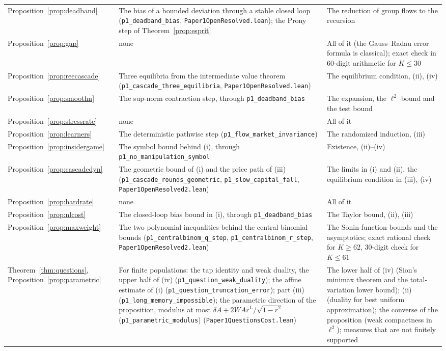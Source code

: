 \documentclass[12pt]{article}
\theoremstyle{definition}
\theoremstyle{remark}
\begin{document}
\begin{longtable}{>{\raggedright\arraybackslash}p{}>{\raggedright\arraybackslash}p{}>{\raggedright\arraybackslash}p{}}
Proposition~\ref{prop:deadband} & The bias of a bounded deviation through a stable closed loop (\texttt{p1\_deadband\_bias}, \nolinkurl{Paper1OpenResolved.lean}); the Prony step of Theorem~\ref{prop:esprit} & The reduction of group flows to the recursion\\
Proposition~\ref{prop:gap} & none & All of it (the Gauss--Radau error formula is classical); exact check in 60-digit arithmetic for $K\le30$\\
Proposition~\ref{prop:reecascade} & Three equilibria from the intermediate value theorem (\texttt{p1\_cascade\_three\_equilibria}, \nolinkurl{Paper1OpenResolved.lean}) & The equilibrium condition, (ii), (iv)\\
Proposition~\ref{prop:smoothn} & The sup-norm contraction step, through \texttt{p1\_deadband\_bias} & The expansion, the $\ell^2$ bound and the test bound\\
Proposition~\ref{prop:stressrate} & none & All of it\\
Proposition~\ref{prop:learners} & The deterministic pathwise step (\texttt{p1\_flow\_market\_invariance}) & The randomized induction, (iii)\\
Proposition~\ref{prop:insidergame} & The symbol bound behind (i), through \texttt{p1\_no\_manipulation\_symbol} & Existence, (ii)--(iv)\\
Proposition~\ref{prop:cascadedyn} & The geometric bound of (i) and the price path of (iii) (\texttt{p1\_cascade\_rounds\_geometric}, \texttt{p1\_slow\_capital\_fall}, \nolinkurl{Paper1OpenResolved2.lean}) & The limits in (i) and (ii), the equilibrium condition in (iii), (iv)\\
Proposition~\ref{prop:hardrate} & none & All of it\\
Proposition~\ref{prop:nlcost} & The closed-loop bias bound in (i), through \texttt{p1\_deadband\_bias} & The Taylor bound, (ii), (iii)\\
Proposition~\ref{prop:maxweight} & The two polynomial inequalities behind the central binomial bounds (\texttt{p1\_centralbinom\_q\_step}, \texttt{p1\_centralbinom\_r\_step}, \nolinkurl{Paper1OpenResolved2.lean}) & The Sonin-function bounds and the asymptotics; exact rational check for $K\ge62$, 30-digit check for $K\le61$\\
Theorem~\ref{thm:questions}, Proposition~\ref{prop:parametric} & For finite populations: the tap identity and weak duality, the upper half of (iv) (\texttt{p1\_question\_weak\_duality}); the affine estimate of (i) (\texttt{p1\_question\_truncation\_error}); part (iii) (\texttt{p1\_long\_memory\_impossible}); the parametric direction of the proposition, modulus at most $\delta A+2\bar WA\bar r^L/\sqrt{1-\bar r^2}$ (\texttt{p1\_parametric\_modulus}) (\nolinkurl{Paper1QuestionsCost.lean}) & The lower half of (iv) (Sion's minimax theorem and the total-variation lower bound); (ii) (duality for best uniform approximation); the converse of the proposition (weak compactness in $\ell^2$); measures that are not finitely supported\\

\end{longtable}
\end{document}
